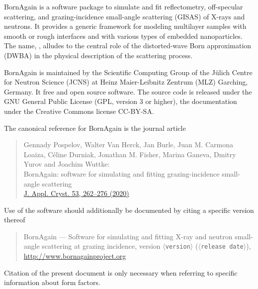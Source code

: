 

\cleardoublepage
{}


BornAgain is a software package
to simulate and fit
reflectometry, off-specular scattering,
and grazing-incidence small-angle scattering (GISAS)
of X-rays and neutrons.
It provides a generic framework
for modeling multilayer samples with smooth or
rough interfaces and with various types of embedded nanoparticles.
The name, \BornAgain,
alludes to the central role of the distorted-wave Born
approximation (DWBA) in the physical description of the
scattering process.

BornAgain is maintained
by the Scientific Computing Group
of the J\"ulich Centre for Neutron Science (JCNS)
at Heinz Maier-Leibnitz Zentrum (MLZ) Garching, Germany.
It free and open source software.
The source code is released under the GNU General Public License (GPL, version 3 or higher),
the documentation under the Creative Commons license CC-BY-SA.


The canonical reference for BornAgain is the journal article
\begin{quote}
Gennady Pospelov, Walter Van Herck, Jan Burle, Juan M. Carmona Loaiza,
Céline Durniak, Jonathan M. Fisher, Marina Ganeva, Dmitry Yurov and
Joachim Wuttke:\\
BornAgain: software for simulating and fitting
grazing-incidence small-angle scattering\\
\href{https://doi.org/10.1107/S1600576719016789}{J. Appl. Cryst. 53, 262–276 (2020)}
\end{quote}
Use of the software should additionally be documented by citing a specific version thereof
%
\begin{quote}
BornAgain --- Software for simulating and fitting
X-ray and neutron small-angle scattering at grazing incidence,
version $\langle$\texttt{version}$\rangle$ ($\langle$\texttt{release date}$\rangle$),\\
\url{http://www.bornagainproject.org}
\end{quote}
Citation of the present document is only necessary
when referring to specific information about form factors.
